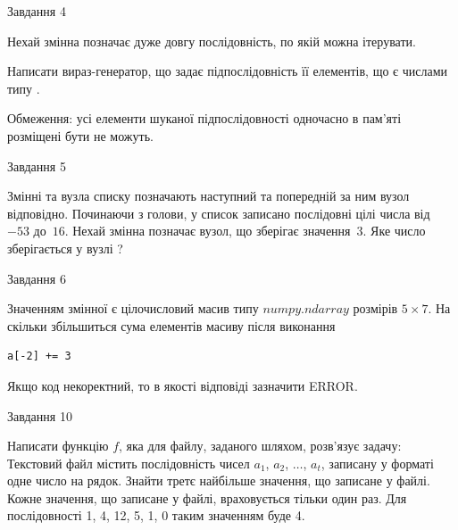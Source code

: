 \documentclass[12pt, ukrainian]{article}
\begin{document}
{\begin{minipage}[t]{8.0cm}
\end{minipage}


               
{\begin{center}Завдання {4}\end{center}}
\vspace{-4mm}
Нехай змінна  позначає дуже довгу послідовність, по якій можна ітерувати.

Написати вираз-генератор, що задає підпослідовність її елементів, що є числами типу .

Обмеження: усі елементи шуканої підпослідовності одночасно в пам'яті розміщені бути не можуть.\par

\vspace{10mm}
               
{\begin{center}Завдання {5}\end{center}}
\vspace{-4mm}
Змінні  та  вузла списку позначають наступний та попередній за ним вузол відповідно. Починаючи з голови, у список записано послідовні цілі числа від~$-53$ до~$16$. Нехай змінна  позначає вузол, що зберігає значення~$3$.
Яке число зберігається у вузлі  ?\par

               
{\begin{center}Завдання {6}\end{center}}
\vspace{-4mm}
Значенням змінної  є цілочисловий масив типу $numpy.ndarray$ розмірів $5{\times}7$. На скільки збільшиться сума елементів масиву  після виконання
\begin{verbatim}
a[-2] += 3
\end{verbatim}


Якщо код некоректний, то в якості відповіді зазначити ERROR.\par

               
{\begin{center}Завдання {10}\end{center}}
\vspace{-4mm}

Написати функцію $f$, яка для файлу, заданого шляхом, розв’язує задачу:\\ Текстовий файл містить послідовність чисел $a_1$, $a_2$, $\ldots$, $a_t$, записану у форматі одне число на рядок. Знайти третє найбільше значення, що записане у файлі. Кожне значення, що записане у файлі, враховується тільки один раз. Для послідовності 1, 4, 12, 5, 1, 0 таким значенням буде 4.

}
\end{document}
